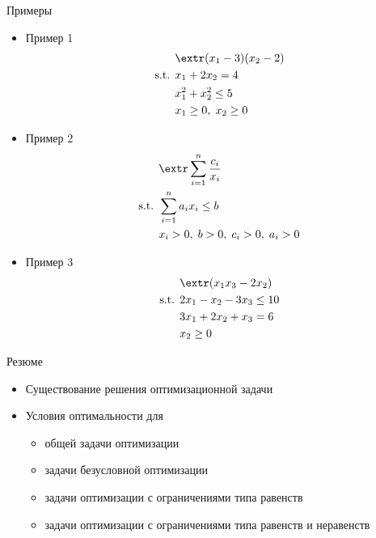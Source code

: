 \documentclass[12pt,russian]{beamer}
\begin{document}
\begin{frame}{Примеры}
\begin{itemize}
\small
\item Пример 1
\vspace{-5mm}
\begin{equation*}
\begin{split}
& \extr (x_1 - 3)(x_2 - 2)\\
\text{s.t. } & x_1 + 2x_2 = 4\\
& x^2_1 + x^2_2 \leq 5\\
& x_1 \geq 0, \; x_2 \geq 0 
\end{split}
\end{equation*} 
\vspace{-5mm}
\item Пример 2
\vspace{-5mm}
\begin{equation*}
\begin{split}
& \extr \sum\limits_{i=1}^n \frac{c_i}{x_i}\\
\text{s.t. } & \sum\limits_{i=1}^n a_ix_i \leq b\\
& x_i > 0, \; b > 0, \; c_i > 0, \; a_i > 0
\end{split}
\end{equation*}
\vspace{-4mm}
\item Пример 3
\vspace{-3mm}
\begin{equation*}
\begin{split}
& \extr (x_1x_3 - 2x_2)\\
\text{s.t. } & 2x_1 - x_2 - 3x_3 \leq 10\\
& 3x_1 + 2x_2 + x_3 = 6\\
& x_2 \geq 0
\end{split}
\end{equation*}
\end{itemize}
\end{frame}

\begin{frame}{Резюме}
\begin{itemize}
\item Существование решения оптимизационной задачи 
\item Условия оптимальности для
\begin{itemize}
\item общей задачи оптимизации
\item задачи безусловной оптимизации
\item задачи оптимизации с ограничениями типа равенств
\item задачи оптимизации с ограничениями типа равенств и неравенств
\end{itemize}
\end{itemize}
\end{frame}
\end{document}
